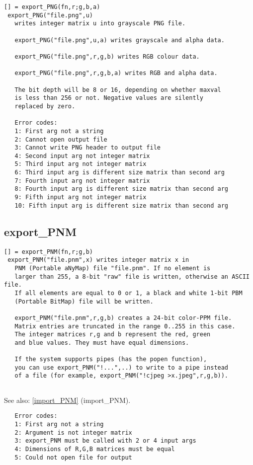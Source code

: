 \documentclass[a4paper]{article}
\begin{document}
\begin{tscreen}
\begin{verbatim}
[] = export_PNG(fn,r;g,b,a)
 export_PNG("file.png",u)
   writes integer matrix u into grayscale PNG file.

   export_PNG("file.png",u,a) writes grayscale and alpha data.

   export_PNG("file.png",r,g,b) writes RGB colour data.

   export_PNG("file.png",r,g,b,a) writes RGB and alpha data.

   The bit depth will be 8 or 16, depending on whether maxval
   is less than 256 or not. Negative values are silently
   replaced by zero.
   
   Error codes:
   1: First arg not a string
   2: Cannot open output file
   3: Cannot write PNG header to output file
   4: Second input arg not integer matrix
   5: Third input arg not integer matrix
   6: Third input arg is different size matrix than second arg
   7: Fourth input arg not integer matrix
   8: Fourth input arg is different size matrix than second arg
   9: Fifth input arg not integer matrix
   10: Fifth input arg is different size matrix than second arg
\end{verbatim}
\end{tscreen}





\subsection{export\_PNM\label{export_PNM}}

\begin{tscreen}
\begin{verbatim}
[] = export_PNM(fn,r;g,b)
 export_PNM("file.pnm",x) writes integer matrix x in
   PNM (Portable aNyMap) file "file.pnm". If no element is
   larger than 255, a 8-bit "raw" file is written, otherwise an ASCII file.
   If all elements are equal to 0 or 1, a black and white 1-bit PBM
   (Portable BitMap) file will be written.

   export_PNM("file.pnm",r,g,b) creates a 24-bit color-PPM file.
   Matrix entries are truncated in the range 0..255 in this case.
   The integer matrices r,g and b represent the red, green
   and blue values. They must have equal dimensions.

   If the system supports pipes (has the popen function),
   you can use export_PNM("!...",..) to write to a pipe instead
   of a file (for example, export_PNM("!cjpeg >x.jpeg",r,g,b)).
   
\end{verbatim}

See also: \ref{import_PNM} {(import\_PNM)}.
\begin{verbatim}
   Error codes:
   1: First arg not a string
   2: Argument is not integer matrix
   3: export_PNM must be called with 2 or 4 input args
   4: Dimensions of R,G,B matrices must be equal
   5: Could not open file for output
\end{verbatim}
\end{tscreen}
\end{document}
